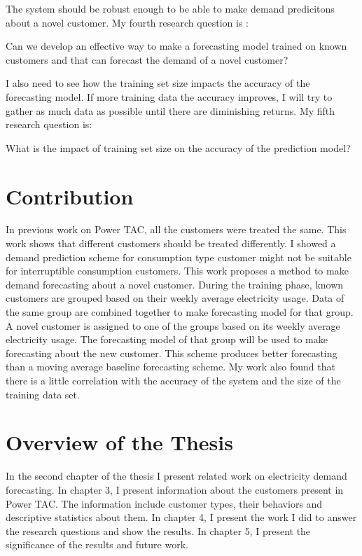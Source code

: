 The system should be robust enough to be able to make demand predicitons about a novel customer. My fourth research question is :
\begin{displayquote}
Can we develop an effective way to make a forecasting model trained on known customers and that can forecast the demand of a novel customer?
\end{displayquote}

I also need to see how the training set size impacts the accuracy of the forecasting model. If more training data the accuracy improves, I will try to gather as much data as possible until there are diminishing returns. My fifth research question is:
\begin{displayquote}
What is the impact of training set size on the accuracy of the prediction model?
\end{displayquote}
 
\section{Contribution}
In previous work on Power TAC, all the customers were treated the same. This work shows that different customers should be treated differently. I showed a demand prediction scheme for consumption type customer might not be suitable for interruptible consumption customers. This work proposes a method to make demand forecasting about a novel customer. During the training phase, known customers are grouped based on their weekly average electricity usage. Data of the same group are combined together to make forecasting model for that group. A novel customer is assigned to one of the groups based on its weekly average electricity usage. The forecasting model of that group will be used to make forecasting about the new customer. This scheme produces better forecasting than a moving average baseline forecasting scheme. My work also found that there is a little correlation with the accuracy of the system and the size of the training data set. 

\section{Overview of the Thesis}
In the second chapter of the thesis I present related work on electricity demand forecasting. In chapter 3, I present information about the customers present in Power TAC. The information include customer types, their behaviors and descriptive statistics about them. In chapter 4, I present the work I did to answer the research questions and show the results. In chapter 5, I present the significance of the results and future work.


